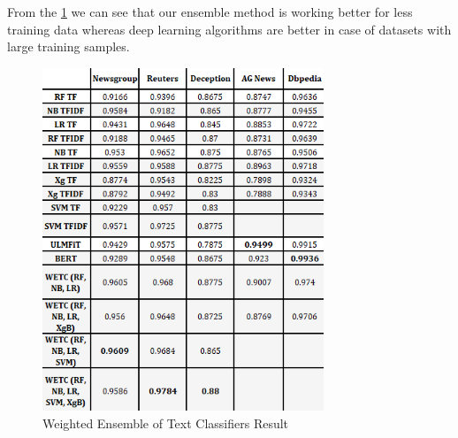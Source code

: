 From the \cref{fig:wetc_res} we can see that our ensemble method is working better for less training data whereas deep learning algorithms are better in case of datasets with large training samples.


\begin{figure}
    \centering
    \includegraphics[width=0.75\textwidth]{images/wetc.png}
    \caption{Weighted Ensemble of Text Classifiers Result}
    \label{fig:wetc_res}
\end{figure}


